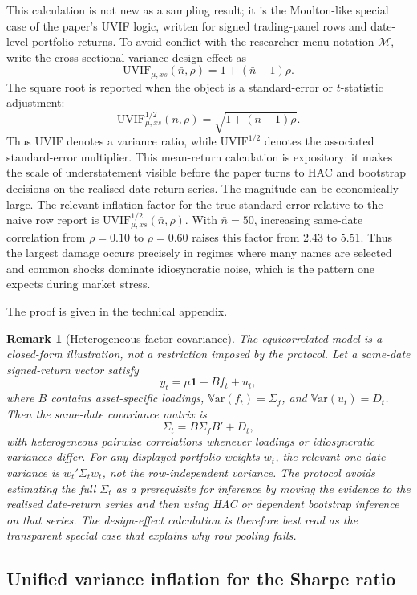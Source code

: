 \documentclass[12pt,a4paper]{article}
\newtheorem{remark}{Remark}
\newcommand{\Var}{\mathbb{V}\mathrm{ar}}
\newcommand{\UVIF}{\mathrm{UVIF}}
\begin{document}
This calculation is not new as a sampling result; it is the
Moulton-like special case of the paper's UVIF logic, written for signed
trading-panel rows and date-level portfolio returns.  To avoid conflict
with the researcher menu notation \(\mathcal M\), write the
cross-sectional variance design effect as
\[
  \UVIF_{\mu,xs}(\bar n,\rho)=1+(\bar n-1)\rho.
\]
The square root is reported when the object is a standard-error or
\(t\)-statistic adjustment:
\[
  \UVIF_{\mu,xs}^{1/2}(\bar n,\rho)=
  \sqrt{1+(\bar n-1)\rho}.
\]
Thus \(\UVIF\) denotes a variance ratio, while \(\UVIF^{1/2}\) denotes
the associated standard-error multiplier.  This mean-return calculation
is expository: it makes the scale of understatement visible before the
paper turns to HAC and bootstrap decisions on the realised date-return
series.
The magnitude can be economically large.  The relevant inflation factor
for the true standard error relative to the naive row report is
\(\UVIF_{\mu,xs}^{1/2}(\bar n,\rho)\).  With \(\bar n=50\), increasing same-date
correlation from \(\rho=0.10\) to \(\rho=0.60\) raises this factor from
2.43 to 5.51.  Thus the largest damage occurs precisely in regimes where
many names are selected and common shocks dominate idiosyncratic noise,
which is the pattern one expects during market stress.

\noindent The proof is given in the technical appendix.

\begin{remark}[Heterogeneous factor covariance]
The equicorrelated model is a closed-form illustration, not a restriction
imposed by the protocol.  Let a same-date signed-return vector satisfy
\[
  y_t=\mu\mathbf 1 + B f_t + u_t,
\]
where \(B\) contains asset-specific loadings, \(\Var(f_t)=\Sigma_f\),
and \(\Var(u_t)=D_t\).  Then the same-date covariance matrix is
\[
  \Sigma_t = B\Sigma_f B' + D_t,
\]
with heterogeneous pairwise correlations whenever loadings or
idiosyncratic variances differ.  For any displayed portfolio weights
\(w_t\), the relevant one-date variance is \(w_t'\Sigma_t w_t\), not the
row-independent variance.  The protocol avoids estimating the full
\(\Sigma_t\) as a prerequisite for inference by moving the evidence to
the realised date-return series and then using HAC or dependent
bootstrap inference on that series.  The design-effect calculation is therefore best read
as the transparent special case that explains why row pooling fails.
\end{remark}

\subsection{Unified variance inflation for the Sharpe ratio}
\end{document}
